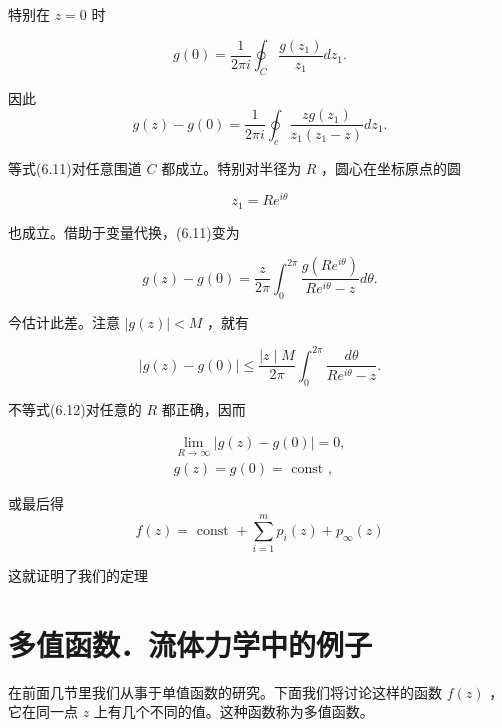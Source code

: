 特别在 $z = 0$ 时

\begin{equation*}
g (0) = \frac {1}{2 \pi i} \oint_ {C} \frac {g \left(z _ {1}\right)}{z _ {1}} d z _ {1}.
\end{equation*}

因此
\begin{equation*}
g (z) - g (0) = \frac {1}{2 \pi i} \oint_ {c} \frac {z g (z _ {1})}{z _ {1} (z _ {1} - z)} d z _ {1}.\tag{6.11}
\end{equation*}

等式(6.11)对任意围道 $C$ 都成立。特别对半径为 $R$ ，圆心在坐标原点的圆

\begin{equation*}
z _ {1} = R e ^ {i \theta}
\end{equation*}

也成立。借助于变量代换，(6.11)变为

\begin{equation*}
g (z) - g (0) = \frac {z}{2 \pi} \int_ {0} ^ {2 \pi} \frac {g (R e ^ {i \theta})}{R e ^ {i \theta} - z} d \theta .
\end{equation*}

今估计此差。注意 $|g(z)| < M$ ，就有

\begin{equation*}
\mid g (z) - g (0) \mid \leqslant \frac {\mid z \mid M}{2 \pi} \int_ {0} ^ {2 \pi} \frac {d \theta}{R e ^ {i \theta} - z}.\tag{6.12}
\end{equation*}

不等式(6.12)对任意的 $R$ 都正确，因而

\begin{equation*}
\begin{array}{l}\lim _ {R \rightarrow \infty} | g (z) - g (0) | = 0,\\g (z) = g (0) = \text { const },\end{array}
\end{equation*}

或最后得
\begin{equation*}
f (z) = \text { const } + \sum_ {i = 1} ^ {m} p _ {i} (z) + p _ {\infty} (z)
\end{equation*}

这就证明了我们的定理

\section{多值函数．流体力学中的例子}

在前面几节里我们从事于单值函数的研究。下面我们将讨论这样的函数 $f(z)$ ，它在同一点 $z$ 上有几个不同的值。这种函数称为多值函数。

